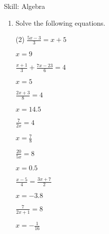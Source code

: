 \begin{bxTip}[colbacktitle=green]{Skill: Algebra}

\begin{enumerate} [leftmargin=0cm] 

\item Solve the following equations.
\begin{tasks}[label=(\alph*), after-item-skip=2pt,after-skip=3pt, label-width=4ex](2)
    \task  $ \frac{5x-3}{3}=x+5                $	           \begin{envAnswer}[blankline=3]         $      x=9         $ \end{envAnswer}
	\task  $ \frac{x+1}{3}+\frac{7x-23}{6}=4   $               \begin{envAnswer}[blankline=3]         $      x=5         $ \end{envAnswer}
    \task  $ \frac{2x+3}{8}=4                  $               \begin{envAnswer}[blankline=3]         $      x=14.5         $ \end{envAnswer}
    \task  $ \frac{7}{2x}=4                    $               \begin{envAnswer}[blankline=3]         $      x=\frac{7}{8}         $ \end{envAnswer}
    \task  $ \frac{20}{5x}=8                   $	           \begin{envAnswer}[blankline=3]         $      x=0.5         $ \end{envAnswer}
	\task  $ \frac{x-5}{4}=\frac{3x+7}{2}      $               \begin{envAnswer}[blankline=3]         $      x=-3.8         $ \end{envAnswer}
	\task  $ \frac{7}{2x+1}=8                  $               \begin{envAnswer}[blankline=3]         $      x=-\frac{1}{16}         $ \end{envAnswer}
\end{tasks}


\end{enumerate}

\end{bxTip}

